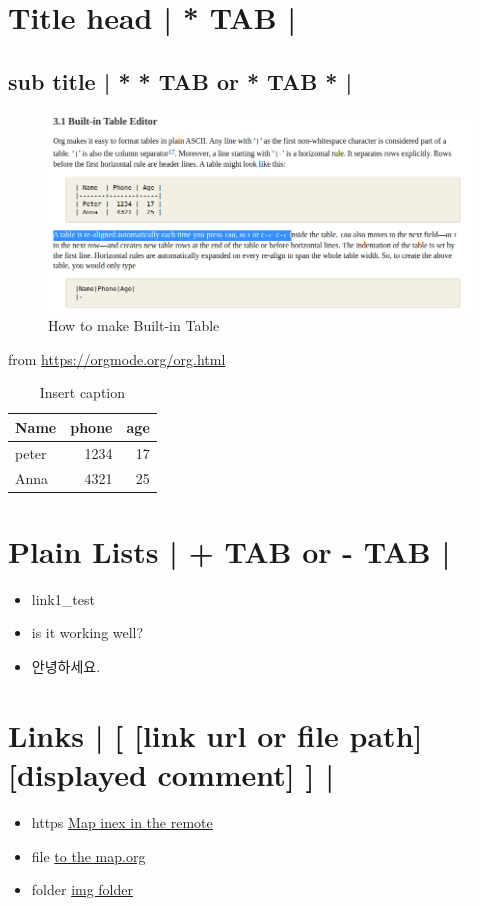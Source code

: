 \documentclass[11pt]{article}
\author{JJ Kim}
\date{\today}
\title{}
\begin{document}
\tableofcontents

\section{Title head  | *  TAB |}
\label{sec:org0b0a6da}
\subsection{sub title | * * TAB or * TAB * |}
\label{sec:orgdbc84ec}
 \begin{figure}[htbp]
\centering
\includegraphics[width=.9\linewidth]{./img/samples/samples1.png}
\caption{\label{fig:a-1}How to make Built-in Table}
\end{figure}
from \url{https://orgmode.org/org.html}

\begin{table}[htbp]
\caption{\label{table: 1}Insert caption}
\centering
\begin{tabular}{lrr}
Name & phone & age\\
\hline
peter & 1234 & 17\\
Anna & 4321 & 25\\
\end{tabular}
\end{table}



\section{Plain Lists | + TAB or - TAB |}
\label{sec:orgf127cbb}
\begin{itemize}
\item link1\_test
\item is it working well?
\item 안녕하세요.
\end{itemize}


\section{Links | [  [link url or file path]  [displayed comment]  ] |}
\label{sec:org939f75e}
\begin{itemize}
\item https    \href{https://syryuauros.github.io/Manuals/}{Map inex in the remote}
\item file       \href{Map.org}{to the map.org}
\item folder  \href{./img/samples/}{img folder}
\end{itemize}
\end{document}
